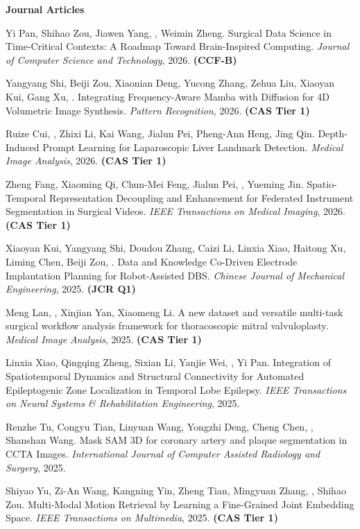 \documentclass[a4paper,12pt,english]{curve}
\begin{document}
{\large\bfseries\sffamily Journal Articles}\par
\vspace{2pt}
\begin{small}
\begin{publist}
\item Yi Pan, Shihao Zou, Jiawen Yang, \WS\CORR, Weimin Zheng. Surgical Data Science in Time-Critical Contexts: A Roadmap Toward Brain-Inspired Computing. \emph{Journal of Computer Science and Technology}, 2026. \textbf{(CCF-B)}
\item Yangyang Shi, Beiji Zou, Xiaonian Deng, Yucong Zhang, Zehua Liu, Xiaoyan Kui, Gang Xu, \WS\CORR. Integrating Frequency-Aware Mamba with Diffusion for 4D Volumetric Image Synthesis. \emph{Pattern Recognition}, 2026. \textbf{(CAS Tier 1)}
\item Ruize Cui\COF, \WS\COF, Zhixi Li\COF, Kai Wang, Jialun Pei\CORR, Pheng-Ann Heng, Jing Qin. Depth-Induced Prompt Learning for Laparoscopic Liver Landmark Detection. \emph{Medical Image Analysis}, 2026. \textbf{(CAS Tier 1)}
\item Zheng Fang, Xiaoming Qi, Chun-Mei Feng, Jialun Pei, \WS, Yueming Jin. Spatio-Temporal Representation Decoupling and Enhancement for Federated Instrument Segmentation in Surgical Videos. \emph{IEEE Transactions on Medical Imaging}, 2026. \textbf{(CAS Tier 1)}
\item Xiaoyan Kui, Yangyang Shi, Doudou Zhang, Caizi Li, Linxia Xiao, Haitong Xu, Liming Chen, Beiji Zou, \WS\CORR. Data and Knowledge Co-Driven Electrode Implantation Planning for Robot-Assisted DBS. \emph{Chinese Journal of Mechanical Engineering}, 2025. \textbf{(JCR Q1)}
\item Meng Lan, \WS, Xinjian Yan, Xiaomeng Li. A new dataset and versatile multi-task surgical workflow analysis framework for thoracoscopic mitral valvuloplasty. \emph{Medical Image Analysis}, 2025. \textbf{(CAS Tier 1)}
\item Linxia Xiao, Qingqing Zheng, Sixian Li, Yanjie Wei, \WS\CORR, Yi Pan. Integration of Spatiotemporal Dynamics and Structural Connectivity for Automated Epileptogenic Zone Localization in Temporal Lobe Epilepsy. \emph{IEEE Transactions on Neural Systems \& Rehabilitation Engineering}, 2025.
\item Renzhe Tu, Congyu Tian, Linyuan Wang, Yongzhi Deng, Cheng Chen, \WS\CORR, Shanshan Wang. Mask SAM 3D for coronary artery and plaque segmentation in CCTA Images. \emph{International Journal of Computer Assisted Radiology and Surgery}, 2025.
\item Shiyao Yu, Zi-An Wang, Kangning Yin, Zheng Tian, Mingyuan Zhang, \WS, Shihao Zou. Multi-Modal Motion Retrieval by Learning a Fine-Grained Joint Embedding Space. \emph{IEEE Transactions on Multimedia}, 2025. \textbf{(CAS Tier 1)}

\end{publist}
\end{small}
\end{document}
